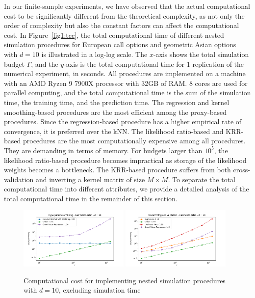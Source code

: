 In our finite-sample experiments, we have observed that the actual computational cost to be significantly different from the theoretical complexity, as not only the order of complexity but also the constant factors can affect the computational cost.
In Figure~\ref{fig1:tcc}, the total computational time of different nested simulation procedures for European call options and geometric Asian options with $d = 10$ is illustrated in a log-log scale.
The $x$-axis shows the total simulation budget $\Gamma$, and the $y$-axis is the total computational time for 1 replication of the numerical experiment, in seconds.
All procedures are implemented on a machine with an AMD Ryzen 9 7900X processor with 32GB of RAM.
8 cores are used for parallel computing, and the total computational time is the sum of the simulation time, the training time, and the prediction time.
The regression and kernel smoothing-based procedures are the most efficient among the proxy-based procedures.
Since the regression-based procedure has a higher empirical rate of convergence, it is preferred over the kNN.
The likelihood ratio-based and KRR-based procedures are the most computationally expensive among all procedures.
They are demanding in terms of memory.
For budgets larger than $10^5$, the likelihood ratio-based procedure becomes impractical as storage of the likelihood weights becomes a bottleneck.
The KRR-based procedure suffers from both cross-validation and inverting a kernel matrix of size $M \times M$.
To separate the total computational time into different attributes, we provide a detailed analysis of the total computational time in the remainder of this section.

\begin{figure}[ht!]
    \centering
    \includegraphics[width=0.48\textwidth]{./project1/figures/figure12a.png}
    \includegraphics[width=0.48\textwidth]{./project1/figures/figure12b.png}
    \caption{Computational cost for implementing nested simulation procedures with $d=10$, excluding simulation time}
    \label{fig1:c_model}
\end{figure}

